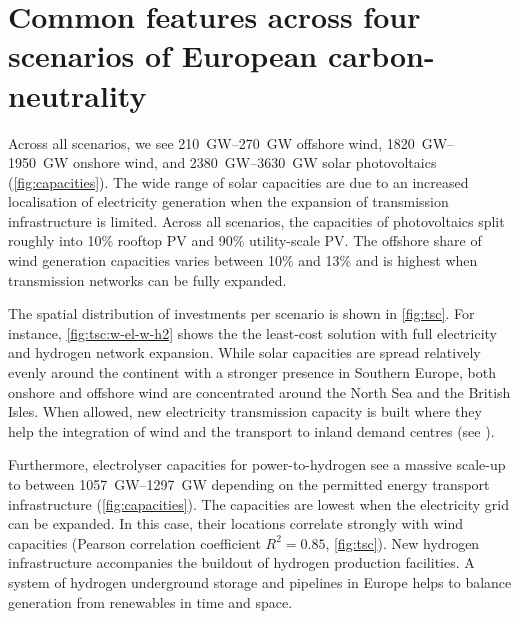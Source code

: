 \section*{Common features across four scenarios of European carbon-neutrality}
\label{sec:es}

Across all scenarios, we see \SIrange{210}{270}{\giga\watt} offshore wind,
\SIrange{1820}{1950}{\giga\watt} onshore wind, and
\SIrange{2380}{3630}{\giga\watt} solar photovoltaics (\cref{fig:capacities}).
The wide range of solar capacities are due to an increased localisation of
electricity generation when the expansion of transmission infrastructure is
limited. Across all scenarios, the capacities of photovoltaics split roughly
into 10\% rooftop PV and 90\% utility-scale PV. The offshore share of wind
generation capacities varies between 10\% and 13\% and is highest when
transmission networks can be fully expanded.

The spatial distribution of investments per scenario is shown in \cref{fig:tsc}.
For instance, \cref{fig:tsc:w-el-w-h2} shows the the least-cost solution with
full electricity and hydrogen network expansion. While solar capacities are
spread relatively evenly around the continent with a stronger presence in
Southern Europe, both onshore and offshore wind are concentrated around the
North Sea and the British Isles. When allowed, new electricity transmission
capacity is built where they help the integration of wind and the transport to
inland demand centres (see ).

Furthermore, electrolyser capacities for power-to-hydrogen see a massive
scale-up to between \SIrange{1057}{1297}{\giga\watt} depending on the permitted
energy transport infrastructure (\cref{fig:capacities}). The capacities are
lowest when the electricity grid can be expanded. In this case, their locations
correlate strongly with wind capacities (Pearson correlation coefficient
$R^2=0.85$, \cref{fig:tsc}). New hydrogen infrastructure accompanies the
buildout of hydrogen production facilities. A system of hydrogen underground
storage and pipelines in Europe helps to balance generation from renewables in
time and space.

